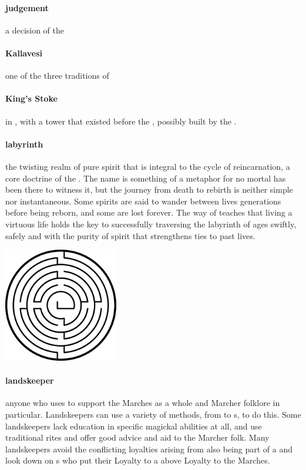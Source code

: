 \paragraph{judgement} a decision of the 
\paragraph{Kallavesi} one of the three traditions of 
\paragraph{King's Stoke}  in , with a tower that existed before the , possibly built by the .
\paragraph{labyrinth}the twisting realm of pure spirit that is integral to the cycle of reincarnation, a core doctrine of the . The name is something of a metaphor for no mortal has been there to witness it, but the journey from death to rebirth is neither simple nor instantaneous. Some spirits are said to wander between lives generations before being reborn, and some are lost forever. The way of  teaches that living a virtuous life holds the key to successfully traversing the labyrinth of ages swiftly, safely and with the purity of spirit that strengthens ties to past lives. \begin{center}\includegraphics[width=5cm]{encyclopedia/Labyrinth} \end{center}
\paragraph{landskeeper} anyone who uses  to support the Marches as a whole and Marcher folklore in particular. Landskeepers can use a variety of methods, from  to s, to do this. Some landskeepers lack education in specific magickal abilities at all, and use traditional rites and offer good advice and aid to the Marcher folk. Many landskeepers avoid the conflicting loyalties arising from also being part of a  and look down on s who put their Loyalty to a  above Loyalty to the Marches.
